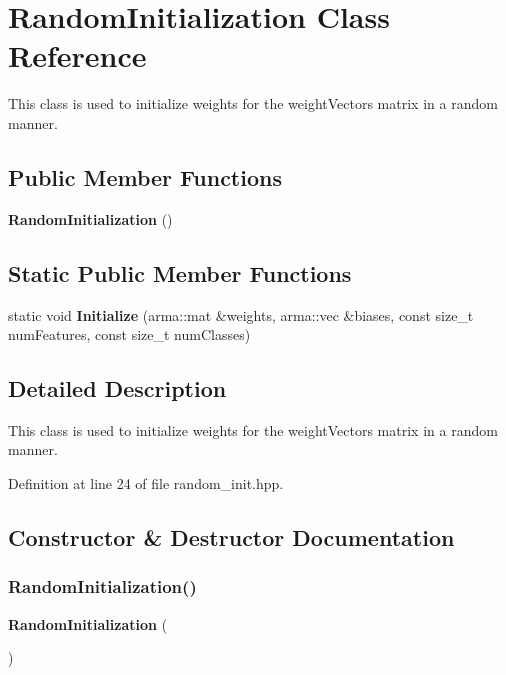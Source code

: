 \section{Random\+Initialization Class Reference}
\label{classmlpack_1_1perceptron_1_1RandomInitialization}


This class is used to initialize weights for the weight\+Vectors matrix in a random manner.  


\subsection*{Public Member Functions}
\begin{DoxyCompactItemize}
\item 
\textbf{ Random\+Initialization} ()
\end{DoxyCompactItemize}
\subsection*{Static Public Member Functions}
\begin{DoxyCompactItemize}
\item 
static void \textbf{ Initialize} (arma\+::mat \&weights, arma\+::vec \&biases, const size\+\_\+t num\+Features, const size\+\_\+t num\+Classes)
\end{DoxyCompactItemize}


\subsection{Detailed Description}
This class is used to initialize weights for the weight\+Vectors matrix in a random manner. 

Definition at line 24 of file random\+\_\+init.\+hpp.



\subsection{Constructor \& Destructor Documentation}
\mbox{\label{classmlpack_1_1perceptron_1_1RandomInitialization_a82f2c9d150d42175823128808690c25a}} 
\subsubsection{Random\+Initialization()}
{\footnotesize\ttfamily \textbf{ Random\+Initialization} (\begin{DoxyParamCaption}{ }\end{DoxyParamCaption})\hspace{0.3cm}{\ttfamily [inline]}}




